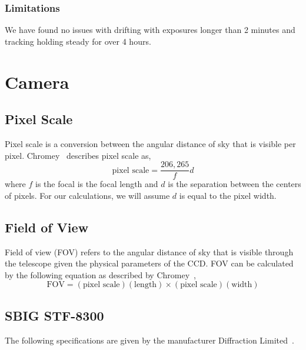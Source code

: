 \subsubsection{Limitations}
We have found no issues with drifting with exposures longer than 2 minutes and tracking holding steady for over 4 hours.

\section{Camera}
\subsection{Pixel Scale}
Pixel scale is a conversion between the angular distance of sky that is visible per pixel.
Chromey~\cite{chromey_2010} describes pixel scale as,
\begin{equation}
    \text{pixel scale} = \frac{206,265}{f} d
    \label{eq:pixelscale}
\end{equation}
where $f$ is the focal is the focal length and $d$ is the separation between the centers of pixels.
For our calculations, we will assume $d$ is equal to the pixel width.

\subsection{Field of View}
Field of view (FOV) refers to the angular distance of sky that is visible through the telescope given the physical parameters of the CCD\@.
FOV can be calculated by the following equation as described by Chromey~\cite{chromey_2010},
\begin{equation}
    \text{FOV} = (\text{pixel scale})(\text{length}) \times (\text{pixel scale})(\text{width})
    \label{eq:fov}
\end{equation}

\subsection{SBIG STF-8300}
The following specifications are given by the manufacturer Diffraction Limited~\cite{sbig}.
